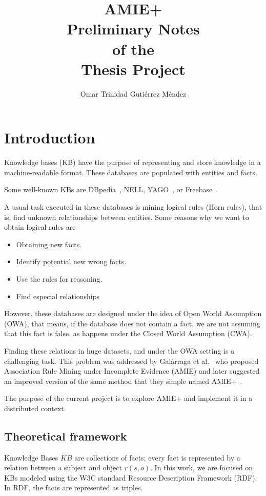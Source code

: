 \documentclass{article}
\title{
AMIE+\\
\large
Preliminary Notes\\
of the\\
Thesis Project
}
\author{Omar Trinidad Guti\'errez M\'endez}
\begin{document}
\maketitle

\section{Introduction}

Knowledge bases (KB) have the purpose of representing and store knowledge in a
machine-readable format. These databases are populated with entities and facts.

Some well-known KBs are DBpedia~\cite{dbpedia-swj}, NELL,
YAGO~\cite{suchanek2007yago}, or Freebase~\cite{bollacker2008freebase}.

A usual task executed in these databases is mining logical rules (Horn rules), that is, find
unknown relationships between entities. Some reasons why we want to obtain
logical rules are

\begin{itemize}
    \item Obtaining new facts.
    \item Identify potential new wrong facts.
    \item Use the rules for reasoning.
    \item Find especial relationships
\end{itemize}

However, these databases are designed under the idea of Open World Assumption
(OWA), that means, if the database does not contain a fact, we are not assuming
that this fact is false, as happens under the Closed World Assumption (CWA).

Finding these relations in huge datasets, and under the OWA setting is a
challenging task. This problem was addressed by Galárraga et
al.~\cite{galarraga2013amie}  who proposed Association Rule Mining under
Incomplete Evidence (AMIE) and later suggested an improved version of the same
method that they simple named AMIE+~\cite{galarraga2015fast}.

The purpose of the current project is to explore AMIE+ and implement it in a
distributed context.

\subsection{Theoretical framework}

Knowledge Bases $KB$ are collections of facts; every fact is represented by a
relation between a subject and object $r(s, o)$. In this work, we are focused
on KBs modeled using the W3C standard Resource Description Framework
(RDF). In RDF, the facts are represented as triples.
\end{document}
